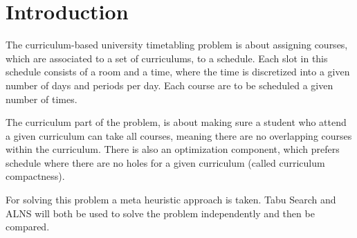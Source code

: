 \section{Introduction}

The curriculum-based university timetabling problem is about assigning courses, which are associated to a set of curriculums, to a schedule. Each slot in this schedule consists of a room and a time, where the time is discretized into a given number of days and periods per day. Each course are to be scheduled a given number of times.

The curriculum part of the problem, is about making sure a student who attend a given curriculum can take all courses, meaning there are no overlapping courses within the  curriculum. There is also an optimization component, which prefers schedule where there are no holes for a given curriculum (called curriculum compactness).

For solving this problem a meta heuristic approach is taken. Tabu Search and ALNS will both be used to solve the problem independently and then be compared.